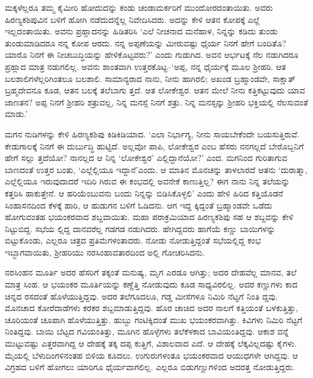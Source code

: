 ಮಕ್ಕಳೆಲ್ಲರೂ ತಮ್ಮ ಕೈಮೀರಿ ಹೋದುದನ್ನು ಕಂಡು ಚಂಡಾಮರ್ಕರಿಗೆ ಮುಂದೋರದಂತಾಯಿತು. ಅವರು ಹಿರಣ್ಯಕಶಿಪುವಿನ ಬಳಿಗೆ ಹೋಗಿ ನಡೆದುದನ್ನೆಲ್ಲ ನಿವೇದಿಸಿದರು. ಅದನ್ನು ಕೇಳಿ ಆತನ ಕೋಪಕ್ಕೆ ಎಲ್ಲೆ ಇಲ್ಲದಂತಾಯಿತು. ಅವನು ಪ್ರಹ್ಲಾದನನ್ನು ಹಿಡಿತರಿಸಿ ‘ಎಲೆ ನೀಚನಾದ ಮನೆಹಾಳ, ನಿನ್ನನ್ನು ಕಡಿದು ತುಂಡು ತುಂಡುಮಾಡಿದರೂ ನನ್ನ ಕೋಪ ಆರದು. ನನ್ನ ಅಪ್ಪಣೆಯನ್ನು ಮೀರುವಷ್ಟು ಧೈರ್ಯ ನಿನಗೆ ಹೇಗೆ ಬಂದಿತೊ? ಯಾರೊ ನಿನಗೆ ಈ ನೀಚಬುದ್ಧಿಯನ್ನು ಹೇಳಿಕೊಟ್ಟವರು?’ ಎಂದು ಗುಡುಗಿದ. ಅವನ ಆರ್ಭಟಕ್ಕೆ ನೆಲ ನಡುಗಿದರೂ ಪ್ರಹ್ಲಾದ ಮಾತ್ರ ನಡುಗಲಿಲ್ಲ. ಅವನು ಶಾಂತವಾಗಿ ಉತ್ತರಕೊಟ್ಟ–‘ಅಪ್ಪ, ನನ್ನ ಧೈರ್ಯಕ್ಕೆ ಮೂಲ ಶ್ರೀಹರಿ. ಆತ ಬಲಶಾಲಿಗಳೆಲ್ಲರಿಗಿಂತಲೂ ಬಲಶಾಲಿ. ಸಾಮಾನ್ಯರಾದ ನಾನು, ನೀನು ಹಾಗಿರಲಿ; ಅಖಂಡ ಬ್ರಹ್ಮಾಂಡವೇ, ಸಾಕ್ಷಾತ್ ಬ್ರಹ್ಮದೇವನೂ ಕೂಡ, ಆತನ ಬಲಕ್ಕೆ ತಲೆಬಾಗು ತ್ತದೆ. ಆತ ಲೋಕೇಶ್ವರ. ಆತನ ಮೇಲೆ ನೀನು ಕತ್ತಿಕಟ್ಟುವುದು ಯಾವ ಜಾಣತನ? ಅಪ್ಪ ನಿನಗೆ ಶ್ರೀಹರಿ ಶತ್ರುವಲ್ಲ, ನಿನ್ನ ಮನಸ್ಸೆ ನಿನಗೆ ಶತ್ರು. ನಿನ್ನ ಮನಸ್ಸನ್ನು ಶ್ರೀಹರಿ ಭಕ್ತಿಯಲ್ಲಿ ನೆಲಸುವಂತೆ ಮಾಡು.’

ಮಗನ ನುಡಿಗಳನ್ನು ಕೇಳಿ ಹಿರಣ್ಯಕಶಿಪು ಕಿಡಿಕಿಡಿಯಾದ. ‘ಎಲಾ ನಿರ್ಭಾಗ್ಯ, ನೀನು ಸಾಯಬೇಕೆಂದೇ ಬಯಸುತ್ತಿರುವೆ. ಕೇಡುಗಾಲಕ್ಕೆ ನಿನಗೆ ಈ ದುರ್ಬುದ್ಧಿ ಹುಟ್ಟಿದೆ. ಅಲ್ಲವೋ ಪಾಪಿ, ಲೋಕೇಶ್ವರ ಎಂಬ ಹೆಸರು ನನಗಲ್ಲದೆ ಬೇರೊಬ್ಬನಿಗೆ ಹೇಗೆ ಸಲ್ಲು ತ್ತದೆಯೋ? ನಾನಲ್ಲದ ಆ ನಿನ್ನ ‘ಲೋಕೇಶ್ವರ’ ಎಲ್ಲಿದ್ದಾನೆಯೋ?’ ಎಂದ. ಮಗನಿಂದ ಗುರಿತಾಗುವ ಬಾಣದಂತೆ ಉತ್ತರ ಬಂತು, ‘ಎಲ್ಲೆಲ್ಲಿಯೂ ಇದ್ದಾನೆ’ಎಂದು. ಆ ಮಾತಿನ ಮೊನಚನ್ನು ತಾಳಲಾರದೆ ಆತನು ‘ದುರಾತ್ಮಾ, ಎಲ್ಲೆಲ್ಲಿಯೂ ಇರುವುದಾದರೆ ಇದಿರಿ ಗಿರುವ ಈ ಕಂಭದಲ್ಲಿ ಅವನೇಕೆ ಕಾಣುತ್ತಿಲ್ಲ? ಈಗ ನಾನು ನಿನ್ನ ತಲೆಯನ್ನು ಕತ್ತರಿಸಿ ಹಾಕುತ್ತೇನೆ. ಆ ಹರಿಯೆಂಬುವನು ಬಂದು ನಿನ್ನನ್ನು ಬಿಡಿಸಿಕೊಳ್ಳಲಿ’ ಎಂದು ಹೇಳಿ ಹಿರಿದ ಕತ್ತಿಯೊಡನೆ ಸಿಂಹಾಸನದಿಂದ ಕೆಳಕ್ಕೆ ಹಾರಿ, ಆ ಹುಡುಗನ ಬಳಿಗೆ ಓಡಿದನು. ಆಗ ಇದ್ದ ಕ್ಕಿದ್ದಂತೆ ಬ್ರಹ್ಮಾಂಡವೇ ಒಡೆದು ಹೋಗುವಂತಹ ಭಯಂಕರವಾದ ಶಬ್ದವಾಯಿತು. ಮಹಾ ಪರಾಕ್ರಮಿಯಾದ ಹಿರಣ್ಯಕಶಿಪು ಸಹ ಆ ಶಬ್ದವನ್ನು ಕೇಳಿ ನಿಟ್ಟುಬಿದ್ದ. ಸಭೆಯ ಲ್ಲಿದ್ದ ದಾನವರೆಲ್ಲ ಗಡಗಡ ನಡುಗಿದರು. ಹೇಗಿದ್ದವರು ಹಾಗೆಯೆ ಕಣ್ಣು ಬಾಯಿಗಳನ್ನು ಬಿಟ್ಟುಕೊಂಡು, ಎಲ್ಲರೂ ಚಿತ್ರದ ಪ್ರತಿಮೆಗಳಂತಾದರು. ನೋಡು ನೋಡುತ್ತಿದ್ದಂತೆ ಸಭೆಯಲ್ಲಿದ್ದ ಕಂಭ ಇಬ್ಭಾಗವಾಯಿತು, ಶ್ರೀಹರಿಯು ನರಸಿಂಹಾವತಾರದಿಂದ ಅಲ್ಲಿ ಗೋಚರಿಸಿದನು.

ನರಸಿಂಹನ ಮೂರ್ತಿ ಅದರ ಹೆಸರಿಗೆ ತಕ್ಕಂತೆ ಮನುಷ್ಯ, ಮೃಗ ಎರಡೂ ಆಗಿತ್ತು; ಅದರ ದೇಹವೆಲ್ಲ ಮಾನವ, ತಲೆ ಮಾತ್ರ ಸಿಂಹ. ಆ ಭಯಂಕರ ಮೂರ್ತಿಯನ್ನು ಕಣ್ಣೆತ್ತಿ ನೋಡುವುದು ಕೂಡ ಸಾಧ್ಯವಿರಲಿಲ್ಲ. ಅದರ ಕಣ್ಣುಗಳು ಕಾದ ಚಿನ್ನದ ರಸದಂತೆ ಹೊಳೆಯುತ್ತಿದ್ದವು. ಅದರ ತಲೆಗೂದಲೂ, ಗಡ್ಡ ಮೀಸೆಗಳೂ ನಿಮಿರಿ ನೆಟ್ಟಗೆ ನಿಂತಿ ದ್ದವು. ಮೊನಚಾದ ಕೋರೆದಾಡೆಗಳು ಕರಕರ ಶಬ್ದಮಾಡುತ್ತಿದ್ದವು. ಹೊರ ಚಾಚಿದ ಅದರ ನಾಲಗೆ ಕತ್ತಿಯಂತೆ ಬಳಕುತ್ತಿತ್ತು, ಚೂರಿಯಂತೆ ಚೂಪಾಗಿ ಹೊಳೆಯುತ್ತಿತ್ತು. ಹುಬ್ಬು ಗಂಟಿಕ್ಕಿದಂತೆ ಮುಖ ಭಯಂಕರವಾಗಿತ್ತು. ಕಿವಿಗಳು ನಿಮಿರಿ ನೆಟ್ಟಗೆ ನಿಂತಿದ್ದವು. ಬಾಯಿ ಬೆಟ್ಟದ ಗವಿಯಂತಿತ್ತು, ಮೂಗಿನ ಹೊಳ್ಳೆಗಳು ತಲೆಕೆಳಕಾದ ಬಾವಿಯಂತಿದ್ದವು. ಆಕಾಶ ವನ್ನೆ ಮುಟ್ಟುವಷ್ಟು ಎತ್ತರವಾಗಿದ್ದ ಆ ದೇಹಕ್ಕೆ ತಕ್ಕ ದಪ್ಪ ಕುತ್ತಿಗೆ, ವಿಶಾಲವಾದ ಎದೆ. ಆ ದೇಹಕ್ಕೆ ಲೆಕ್ಕವಿಲ್ಲದಷ್ಟು ಕೈಗಳು. ಮೈಯಲ್ಲಿ ಬೆಳುದಿಂಗಳಿನಂತಹ ಬಿಳಿಯ ಕೂದಲು. ಉಗುರುಗಳಂತೂ ಭಯಂಕರವಾದ ಆಯುಧಗಳೇ ಆಗಿದ್ದವು. ಆ ವಿಗ್ರಹದ ಬಳಿಗೆ ಹೋಗಲು ಯಾರಿಗೂ ಧೈರ್ಯವಾಗಲಿಲ್ಲ. ಎಲ್ಲರೂ ಬಿಡುಗಣ್ಣುಗಳಿಂದ ಅದರತ್ತ ನೋಡುತ್ತಿದ್ದರು.

